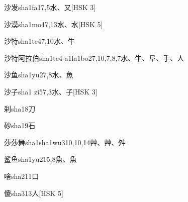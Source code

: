 \begin{entry}{沙发}{sha1fa1}{7,5}{⽔、⼜}[HSK 3]
\end{entry}

\begin{entry}{沙漠}{sha1mo4}{7,13}{⽔、⽔}[HSK 5]
\end{entry}

\begin{entry}{沙特}{sha1te4}{7,10}{⽔、⽜}
\end{entry}

\begin{entry}{沙特阿拉伯}{sha1te4 a1la1bo2}{7,10,7,8,7}{⽔、⽜、⾩、⼿、⼈}
\end{entry}

\begin{entry}{沙鱼}{sha1yu2}{7,8}{⽔、⿂}
\end{entry}

\begin{entry}{沙子}{sha1 zi5}{7,3}{⽔、⼦}[HSK 3]
\end{entry}

\begin{entry}{刹}{sha1}{8}{⼑}
\end{entry}

\begin{entry}{砂}{sha1}{9}{⽯}
\end{entry}

\begin{entry}{莎莎舞}{sha1sha1wu3}{10,10,14}{⾋、⾋、⾇}
\end{entry}

\begin{entry}{鲨鱼}{sha1yu2}{15,8}{⿂、⿂}
\end{entry}

\begin{entry}{啥}{sha2}{11}{⼝}
\end{entry}

\begin{entry}{傻}{sha3}{13}{⼈}[HSK 5]
\end{entry}

